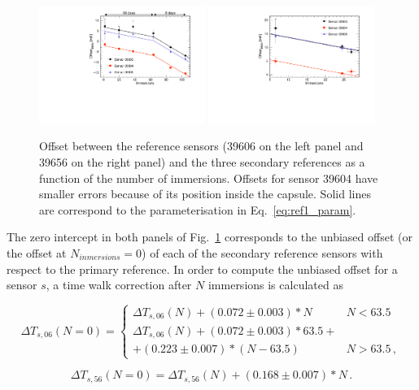 \begin{figure}[htbp]
\centering
{\includegraphics[width=0.48\textwidth]{images/figure_12_a.pdf}}
{\includegraphics[width=0.48\textwidth]{images/figure_12_b.pdf}}
\caption{Offset between the reference sensors (39606 on the left panel and 39656 on the right panel) and the three secondary references as a function of the number of immersions. Offsets for sensor 39604 have smaller errors because of its position inside the capsule. Solid lines are correspond to the parameterisation in Eq.~\ref{eq:ref1_param}.}
\label{fig:offset_ref}
\end{figure}

The zero intercept in both panels of Fig.~\ref{fig:offset_ref} corresponds to the unbiased offset (or the offset at $N_{inmersions}=0$) of each of the secondary reference sensors with respect to the primary reference. In order to compute the unbiased offset for a sensor $s$, a time walk correction after $N$ immersions is calculated as 

\begin{equation}
\Delta T_{s,06}(N=0)=
    \begin{cases}
        \Delta T_{s,06}(N)+(0.072\pm0.003)*N                             & N<63.5\\
        \Delta T_{s,06}(N)+(0.072\pm0.003)*63.5+\\+(0.223\pm0.007)*(N-63.5) & N>63.5 \,,
    \end{cases}
    \label{eq:ref1_param}
\end{equation}

\begin{equation}
\Delta T_{s,56}(N=0)=\Delta T_{s,56}(N)+(0.168\pm0.007)*N  \, .
\label{eq:ref2_param}
\end{equation}


